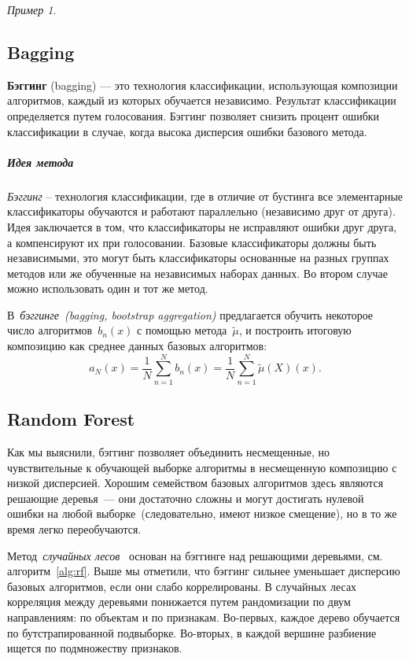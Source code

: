 \documentclass[a4paper, 12pt]{article}
\theoremstyle{plain} %
\theoremstyle{definition} %
\theoremstyle{remark} %
\newtheorem{example}{Пример}
\begin{document}
\begin{example}
\subsection{Bagging}

\textbf{Бэггинг} (bagging) --- это технология классификации, использующая композиции алгоритмов, каждый из которых обучается независимо. Результат классификации определяется путем голосования. Бэггинг позволяет снизить процент ошибки классификации в случае, когда высока дисперсия ошибки базового метода.

\subparagraph{Идея метода}

\emph{Бэггинг} – технология классификации, где в отличие от бустинга все элементарные классификаторы обучаются и работают параллельно (независимо друг от друга). Идея заключается в том, что классификаторы не исправляют ошибки друг друга, а компенсируют их при голосовании. Базовые классификаторы должны быть независимыми, это могут быть классификаторы основанные на разных группах методов или же обученные на независимых наборах данных. Во втором случае можно использовать один и тот же метод.

В~\emph{бэггинге~(bagging, bootstrap aggregation)} предлагается обучить некоторое
число алгоритмов~$b_n(x)$ с помощью метода~$\tilde \mu$, и построить итоговую композицию
как среднее данных базовых алгоритмов:
\[
    a_N(x)
    =
    \frac{1}{N}
    \sum_{n = 1}^{N}
        b_n(x)
    =
    \frac{1}{N}
    \sum_{n = 1}^{N}
        \tilde \mu(X)(x).
\]

\subsection{Random Forest}

Как мы выяснили, бэггинг позволяет объединить несмещенные,
но чувствительные к обучающей выборке алгоритмы в несмещенную
композицию с низкой дисперсией.
Хорошим семейством базовых алгоритмов здесь являются решающие деревья~---
они достаточно сложны и могут достигать нулевой ошибки
на любой выборке~(следовательно, имеют низкое смещение),
но в то же время легко переобучаются.

Метод~\emph{случайных лесов}~\cite{breiman01randomforest} основан на бэггинге над решающими деревьями,
см. алгоритм~\ref{alg:rf}.
Выше мы отметили, что бэггинг сильнее уменьшает дисперсию
базовых алгоритмов, если они слабо коррелированы.
В случайных лесах корреляция между деревьями понижается путем рандомизации
по двум направлениям: по объектам и по признакам.
Во-первых, каждое дерево обучается по бутстрапированной подвыборке.
Во-вторых, в каждой вершине разбиение ищется по подмножеству признаков.


\end{example}
\end{document}
